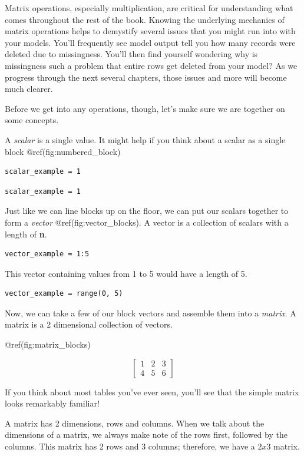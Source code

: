 \documentclass[
  letterpaper,
]{krantz}
\begin{document}
Matrix operations, especially multiplication, are critical for
understanding what comes throughout the rest of the book. Knowing the
underlying mechanics of matrix operations helps to demystify several
issues that you might run into with your models. You'll frequently see
model output tell you how many records were deleted due to missingness.
You'll then find yourself wondering why is missingness such a problem
that entire rows get deleted from your model? As we progress through the
next several chapters, those issues and more will become much clearer.

Before we get into any operations, though, let's make sure we are
together on some concepts.

A \emph{scalar} is a single value. It might help if you think about a
scalar as a single block @ref(fig:numbered\_block)

\begin{verbatim}
scalar_example = 1
\end{verbatim}

\begin{verbatim}
scalar_example = 1
\end{verbatim}

Just like we can line blocks up on the floor, we can put our scalars
together to form a \emph{vector} @ref(fig:vector\_blocks). A vector is a
collection of scalars with a length of \textbf{n}.

\begin{verbatim}
vector_example = 1:5
\end{verbatim}

This vector containing values from 1 to 5 would have a length of 5.

\begin{verbatim}
vector_example = range(0, 5)
\end{verbatim}

Now, we can take a few of our block vectors and assemble them into a
\emph{matrix}. A matrix is a 2 dimensional collection of vectors.

@ref(fig:matrix\_blocks)

\[
\begin{bmatrix}
1 & 2 & 3\\
4 & 5 & 6
\end{bmatrix}
\]

If you think about most tables you've ever seen, you'll see that the
simple matrix looks remarkably familiar!

A matrix has 2 dimensions, rows and columns. When we talk about the
dimensions of a matrix, we always make note of the rows first, followed
by the columns. This matrix has 2 rows and 3 columns; therefore, we have
a \(2x3\) matrix.
\end{document}
